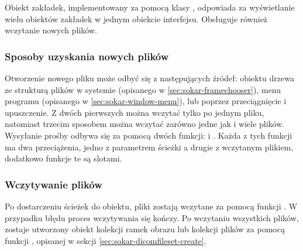 \label{sec:sokar-dicomtabs}

\par
Obiekt zakładek, implementowany za pomocą klasy , odpowiada za wyświetlanie wielu obiektów zakładek w jednym obiekcie interfejsu.
Obsługuje również wczytanie nowych plików.

\subsubsection{Sposoby uzyskania nowych plików}

\par
Otworzenie nowego pliku może odbyć się z następujących źródeł: obiektu drzewa ze strukturą plików w systemie (opisanego w \ref{sec:sokar-framechooser}), menu programu (opisanego w \ref{sec:sokar-window-menu}), lub poprzez przeciągnięcie i upuszczenie.
Z dwóch pierwszych można wczytać tylko po jednym pliku, natomiast trzecim sposobem można wczytać zarówno jedne jak i wiele plików.
Wysyłanie prośby odbywa się za pomocą dwóch funkcji:  i .
Każda z tych funkcji ma dwa przeciążenia, jedno z parametrem ścieżki a drugie z wczytanym plikiem, dodatkowo funkcje te są slotami.

\subsubsection{Wczytywanie plików}

\par
Po dostarczeniu ścieżek do obiektu, pliki zostają wczytane za pomocą funkcji .
W przypadku błędu proces wczytywania się kończy.
Po wczytaniu wszystkich plików, zostaje utworzony obiekt kolekcji ramek obrazu lub kolekcji plików \DICOM za pomocą funkcji , opisanej w sekcji \ref{sec:sokar-dicomfileset-create}.
